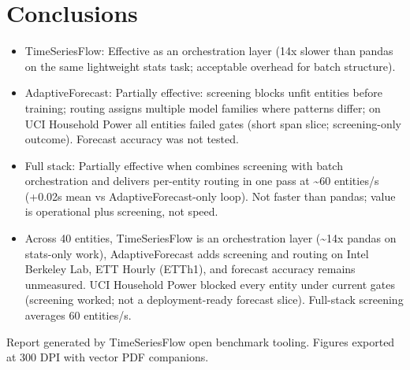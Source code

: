 \documentclass[11pt,a4paper]{article}
\begin{document}
\section{Conclusions}
\begin{itemize}
  \item TimeSeriesFlow: Effective as an orchestration layer (14x slower than pandas on the same lightweight stats task; acceptable overhead for batch structure).
  \item AdaptiveForecast: Partially effective: screening blocks unfit entities before training; routing assigns multiple model families where patterns differ; on UCI Household Power all entities failed gates (short span slice; screening-only outcome). Forecast accuracy was not tested.
  \item Full stack: Partially effective when combines screening with batch orchestration and delivers per-entity routing in one pass at \textasciitilde{}60 entities/s (+0.02s mean vs AdaptiveForecast-only loop). Not faster than pandas; value is operational plus screening, not speed.
  \item Across 40 entities, TimeSeriesFlow is an orchestration layer (\textasciitilde{}14x pandas on stats-only work), AdaptiveForecast adds screening and routing on Intel Berkeley Lab, ETT Hourly (ETTh1), and forecast accuracy remains unmeasured. UCI Household Power blocked every entity under current gates (screening worked; not a deployment-ready forecast slice). Full-stack screening averages 60 entities/s.
\end{itemize}

\vspace{0.5cm}
\noindent Report generated by TimeSeriesFlow open benchmark tooling. Figures exported at 300 DPI with vector PDF companions.
\end{document}
